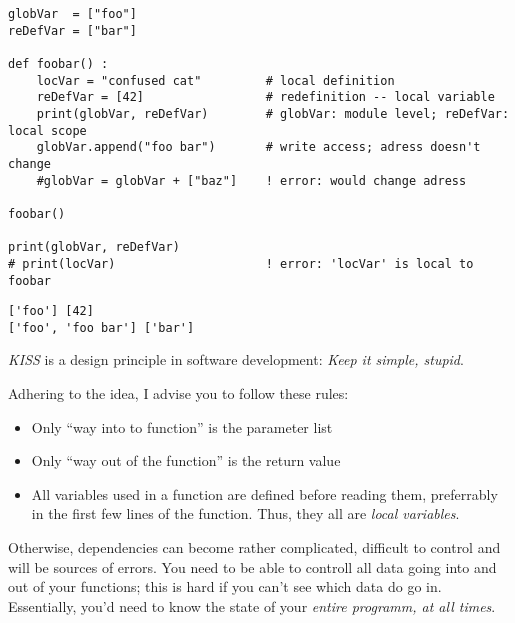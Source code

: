 
\begin{frame}[fragile]
%
\begin{codebox}
\begin{verbatim}
globVar  = ["foo"]
reDefVar = ["bar"]

def foobar() :
    locVar = "confused cat"         # local definition
    reDefVar = [42]                 # redefinition -- local variable
    print(globVar, reDefVar)        # globVar: module level; reDefVar: local scope
    globVar.append("foo bar")       # write access; adress doesn't change
    #globVar = globVar + ["baz"]    ! error: would change adress

foobar()

print(globVar, reDefVar)
# print(locVar)                     ! error: 'locVar' is local to foobar
\end{verbatim}
\end{codebox}
\begin{cmdbox}
\begin{verbatim}
['foo'] [42]
['foo', 'foo bar'] ['bar']
\end{verbatim}
\end{cmdbox}
%
\end{frame}


\begin{frame}
%
\begin{hintbox}
\emph{KISS} is a design principle in software development: \emph{Keep it simple, stupid}.

Adhering to the idea, I advise you to follow these rules:

\begin{itemize}
\item Only \enquote{way into to function} is the parameter list
\item Only \enquote{way out of the function} is the return value
\item All variables used in a function are defined before reading them, preferrably in the first few lines of the function. Thus, they all are \emph{local variables}.
\end{itemize}

Otherwise, dependencies can become rather complicated, difficult to control and will be sources of errors. You need to be able to controll all data going into and out of your functions; this is hard if you can't see which data do go in. Essentially, you'd need to know the state of your \emph{entire programm, at all times}.
\end{hintbox}
%
\end{frame}